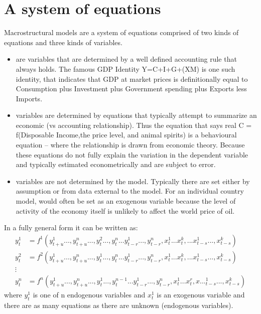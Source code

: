 \documentclass[letterpaper,10pt,english]{jupyterBook}
\begin{document}
\section{A system of equations}
\label{\detokenize{content/02_MacrostructuralModels/MacroStructuralModels:a-system-of-equations}}
\sphinxAtStartPar
Macro\sphinxhyphen{}structural models are a system of equations comprised of two kinds of equations and three kinds of variables.
\begin{itemize}
\item {} 
\sphinxAtStartPar
{} are variables that are determined by a well defined accounting rule that always holds. The famous GDP Identity Y=C+I+G+(X\sphinxhyphen{}M) is one such identity, that indicates that GDP at market prices is definitionally equal to Consumption plus Investment plus Government spending plus Exports less Imports.

\item {} 
\sphinxAtStartPar
{} variables are determined by equations that typically attempt to summarize an economic (vs accounting relationship). Thus the equation that says real C = f(Disposable Income,the price level, and animal spirits) is a behavioural equation – where the relationship is drawn from economic theory. Because these equations do not fully explain the variation in the dependent variable and typically estimated econometrically and are subject to error.

\item {} 
\sphinxAtStartPar
{} variables are not determined by the model. Typically there are set either by assumption or from data external to the model.  For an individual country model, would often be set as an exogenous variable because the level of activity of the economy itself is unlikely to affect the world price of oil.

\end{itemize}

\sphinxAtStartPar
In a fully general form it can be written as:
\begin{align*}
y_t^1  &=  f^1(y_{t+u}^1...,y_{t+u}^n...,y_t^2...,y_{t}^n...y_{t-r}^1...,y_{t-r}^n,x_t^1...x_{t}^k,...x_{t-s}^1...,x_{t-s}^k) \\
y_t^2  &=  f^2(y_{t+u}^1...,y_{t+u}^n...,y_t^1...,y_{t}^n...y_{t-r}^1...,y_{t-r}^n,x_t^1...x_{t}^k,...x_{t-s}^1...,x_{t-s}^k) \\
\vdots \\
y_t^n  &=  f^n(y_{t+u}^1...,y_{t+u}^n...,y_t^1...,y_{t}^{n-1}...y_{t-r}^1...,y_{t-r}^n,x_t^1...x_{t}^r,x..._{t-s}^1...,x_{t-s}^k)
\end{align*}
\sphinxAtStartPar
where \( y_t^1 \) is one of n endogenous variables and \(x_t^1\) is an exogenous variable and there are as many equations as there are unknown (endogenous variables).
\end{document}

